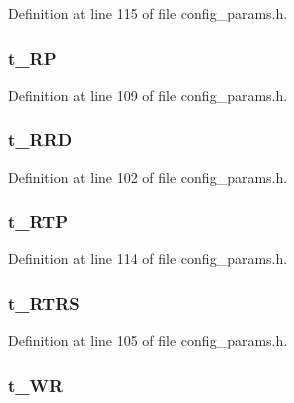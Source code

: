 Definition at line 115 of file config\_\-params.h.
\subsubsection[{t\_\-RP}]{ {\bf t\_\-RP}}\label{config__params_8h_450ac5bc984f4919d77f393a415fcb67}




Definition at line 109 of file config\_\-params.h.
\subsubsection[{t\_\-RRD}]{ {\bf t\_\-RRD}}\label{config__params_8h_37ffc12def32694d56e78b377b97772a}




Definition at line 102 of file config\_\-params.h.
\subsubsection[{t\_\-RTP}]{ {\bf t\_\-RTP}}\label{config__params_8h_0914d4451f1ceba4606b651fe3d58854}




Definition at line 114 of file config\_\-params.h.
\subsubsection[{t\_\-RTRS}]{ {\bf t\_\-RTRS}}\label{config__params_8h_878d3dc90fd5fee1108c736ad43d7607}




Definition at line 105 of file config\_\-params.h.
\subsubsection[{t\_\-WR}]{ {\bf t\_\-WR}}\label{config__params_8h_59cb204d6cd0bc9403224348bd724436}




